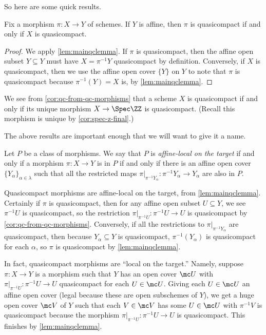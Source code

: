 \documentclass[../notes.tex]{subfiles}
\begin{document}
So here are some quick results.
\begin{cor} \label{cor:qc-from-qc-morphisms}
	Fix a morphism $\pi\colon X\to Y$ of schemes. If $Y$ is affine, then $\pi$ is quasicompact if and only if $X$ is quasicompact.
\end{cor}
\begin{proof}
	We apply \autoref{lem:mainqclemma}. If $\pi$ is quasicompact, then the affine open subset $Y\subseteq Y$ must have $X=\pi^{-1}Y$ quasicompact by definition. Conversely, if $X$ is quasicompact, then we use the affine open cover $\{Y\}$ on $Y$ to note that $\pi$ is quasicompact because $\pi^{-1}(Y)=X$ is, by \autoref{lem:mainqclemma}.
\end{proof}
\begin{example}
	We see from \autoref{cor:qc-from-qc-morphisms} that a scheme $X$ is quasicompact if and only if its unique morphism $X\to\Spec\ZZ$ is quasicompact. (Recall this morphism is unique by \autoref{cor:spec-z-final}.)
\end{example}
The above results are important enough that we will want to give it a name.
\begin{definition}
	Let $P$ be a class of morphisms. We say that $P$ is \textit{affine-local on the target} if and only if a morphism $\pi\colon X\to Y$ is in $P$ if and only if there is an affine open cover $\{Y_\alpha\}_{\alpha\in\lambda}$ such that all the restricted maps $\pi|_{\pi^{-1}Y_\alpha}\colon\pi^{-1}Y_\alpha\to Y_\alpha$ are also in $P$.
\end{definition}
\begin{example}
	Quasicompact morphisms are affine-local on the target, from \autoref{lem:mainqclemma}. Certainly if $\pi$ is quasicompact, then for any affine open subset $U\subseteq Y$, we see $\pi^{-1}U$ is quasicompact, so the restriction $\pi|_{\pi^{-1}U}\colon\pi^{-1}U\to U$ is quasicompact by \autoref{cor:qc-from-qc-morphisms}. Conversely, if all the restrictions to $\pi|_{\pi^{-1}Y_\alpha}$ are quasicompact, then because $Y_\alpha\subseteq Y$ is quasicompact, $\pi^{-1}(Y_\alpha)$ is quasicompact for each $\alpha$, so $\pi$ is quasicompact by \autoref{lem:mainqclemma}.
\end{example}
\begin{remark} \label{rem:qc-local-target}
	In fact, quasicompact morphisms are ``local on the target.'' Namely, suppose $\pi\colon X\to Y$ is a morphism such that $Y$ has an open cover $\mc U$ with $\pi|_{\pi^{-1}U}\colon\pi^{-1}U\to U$ quasicompact for each $U\in\mc U$. Giving each $U\in\mc U$ an affine open cover (legal because these are open subschemes of $Y$), we get a huge open cover $\mc V$ of $Y$ such that each $V\in\mc V$ has some $U\in\mc U$ with $\pi^{-1}V$ is quasicompact because the morphism $\pi|_{\pi^{-1}U}\colon\pi^{-1}U\to U$ is quasicompact. This finishes by \autoref{lem:mainqclemma}.
\end{remark}
\end{document}
